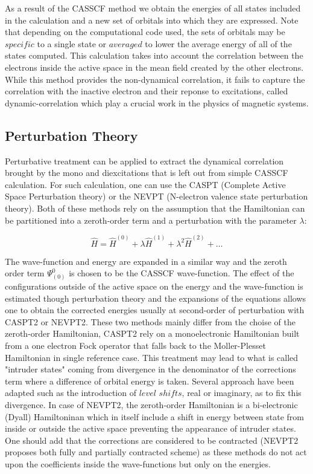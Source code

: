 \documentclass[12pt]{report}
\numberwithin{equation}{section}
\begin{document}
As a result of the CASSCF method we obtain the energies of all states included in the calculation and a new set of orbitals into which they are expressed.
Note that depending on the computational code used, the sets of orbitals may be $specific$ to a single state or $averaged$ to lower the average energy of all of the states computed.
This calculation takes into account the correlation between the electrons inside the active space in the mean field created by the other electrons. 
While this method provides the non-dynamical correlation, it fails to capture the correlation with the inactive electron and their reponse to excitations, called dynamic-correlation which play a crucial work in the physics of magnetic systems.


\subsection{Perturbation Theory}

Perturbative treatment can be applied to extract the dynamical correlation brought by the mono and diexcitations that is left out from simple CASSCF calculation. For such calculation, one can use the CASPT (Complete Active Space Perturbation theory)
or the NEVPT (N-electron valence state perturbation theory). Both of these methods rely on the assumption that the Hamiltonian can be partitioned into a zeroth-order term and a perturbation with the parameter $\lambda$:

\begin{equation}
    \hat{H}=\hat{H}^{(0)}+\lambda\hat{H}^{(1)}+\lambda^2 \hat{H}^{(2)}+\ldots
\end{equation}


The wave-function and energy are expanded in a similar way and the zeroth order term $\Psi_{(0)}^{0}$ is chosen to be the CASSCF wave-function. 
The effect of the configurations outside of the active space on the energy and the wave-function is estimated though perturbation theory and the expansions of the equations allows one to obtain the corrected energies
usually at second-order of perturbation with CASPT2 or NEVPT2. These two methods mainly differ from the choise of the zeroth-order Hamiltonian, CASPT2 rely on a monoelectronic Hamiltonian built from a one electron Fock operator that falls back to the Moller-Plesset Hamiltonian in single reference case. 
This treatment may lead to what is called "intruder states" coming from divergence in the denominator of the corrections term where a difference of orbital energy is taken. Several approach have been adapted such as the introduction of  $level$ $shifts$, real or imaginary, as to fix this divergence.
In case of NEVPT2, the zeroth-order Hamiltonian is a bi-electronic (Dyall) Hamiltoninan which in itself include a shift in energy between state from inside or outside the active space preventing the appearance of intruder states.
One should add that the corrections are considered to be contracted (NEVPT2 proposes both fully and partially contracted scheme) as these methods do not act upon the coefficients inside the wave-functions but only on the energies.
\end{document}
